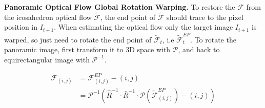 \textbf{Panoramic Optical Flow Global Rotation Warping.}
To restore the $\mathcal{F}$ from the icosahedron optical flow $\tilde{\mathcal{F}}$, the end point of $\tilde{\mathcal{F}}$ should trace to the pixel position in $I_{t+1}$.
% 
When estimating the optical flow only the target image $I_{t+1}$ is warped, so just need to rotate the end point of $\tilde{\mathcal{F}}_t$, i.e $\tilde{\mathcal{F}}^{EP}_t$. 
%
To rotate the panoramic image, first transform it to 3D space with $\mathcal{P}$, and back to equirectangular image with $\mathcal{P}^{-1}$.

\begin{equation}\label{equ:approach:globalwarp}
\begin{split}
	\mathcal{F}_{(i,j)} &= \mathcal{F}^{EP}_{(i,j)} - (i,j)  \\
				&= \mathcal{P}^{-1} \left( \hat{R}^{-1} \cdot \bar{R}^{-1} \cdot \mathcal{P}(\tilde{\mathcal{F}}^{EP}_{(i,j)}) - (i,j)\right)
\end{split}
\end{equation}
